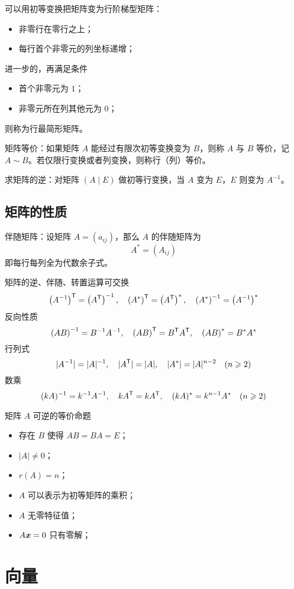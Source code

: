 可以用初等变换把矩阵变为行阶梯型矩阵：
\begin{itemize}
	\item 非零行在零行之上；
	\item 每行首个非零元的列坐标递增；
\end{itemize}
进一步的，再满足条件
\begin{itemize}
	\item 首个非零元为 $1$；
	\item 非零元所在列其他元为 $0$；
\end{itemize}
则称为行最简形矩阵。

矩阵等价：如果矩阵 $A$ 能经过有限次初等变换变为 $B$，则称 $A$ 与 $B$ 等价，记 $A \sim B$。若仅限行变换或者列变换，则称行（列）等价。

求矩阵的逆：对矩阵 $(A \mid E)$ 做初等行变换，当 $A$ 变为 $E$，$E$ 则变为 $A^{-1}$。

\subsection{矩阵的性质}

伴随矩阵：设矩阵 $A = (a_{ij})$，那么 $A$ 的伴随矩阵为
\[ A^*=(A_{ij}) \]
即每行每列全为代数余子式。

矩阵的逆、伴随、转置运算可交换
\[ {\left(A^{-1}\right)}^\mathsf{T} = \left({A}^\mathsf{T}\right)^{-1}, \quad {\left(A^{*}\right)}^\mathsf{T} = \left({A}^\mathsf{T}\right)^{*}, \quad \left(A^{*}\right)^{-1} = \left(A^{-1}\right)^{*} \]
反向性质
\[ \left(AB\right)^{-1} = B^{-1}A^{-1}, \quad {\left(AB\right)}^\mathsf{T} = {B}^\mathsf{T} {A}^\mathsf{T}, \quad \left(AB\right)^{*} = B^{*}A^{*} \]
行列式
\[ |A^{-1}| = |A|^{-1}, \quad |{A}^\mathsf{T}| = |A|, \quad |A^{*}| = |A|^{n-2} \quad (n \geqslant 2) \]
数乘
\[ (kA)^{-1} = k^{-1} A^{-1}, \quad {kA}^\mathsf{T} = k{A}^\mathsf{T}, \quad (kA)^{*} = k^{n-1} A^{*} \quad (n \geqslant 2) \]

矩阵 $A$ 可逆的等价命题
\begin{itemize}
	\item 存在 $B$ 使得 $AB = BA = E$；
	\item $|A| \neq 0$；
	\item $r(A) = n$；
	\item $A$ 可以表示为初等矩阵的乘积；
	\item $A$ 无零特征值；
	\item $A\boldsymbol{x} = 0$ 只有零解；
\end{itemize}

\section{向量}

